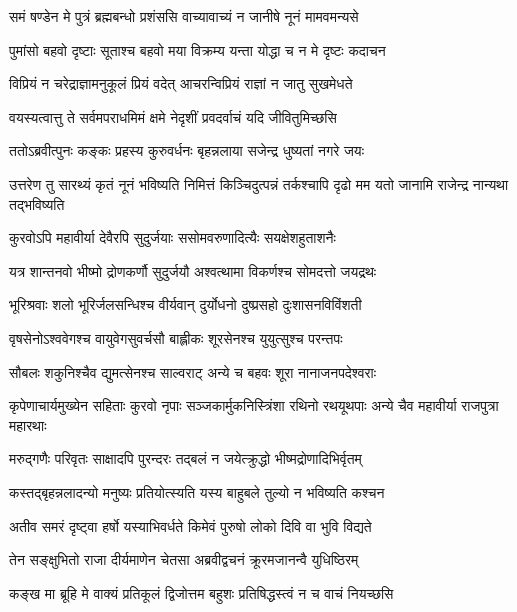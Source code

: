 


\twolineshloka
{समं षण्डेन मे पुत्रं ब्रह्मबन्धो प्रशंससि}
{वाच्यावाच्यं न जानीषे नूनं मामवमन्यसे}


\twolineshloka
{पुमांसो बहवो दृष्टाः सूताश्च बहवो मया}
{विक्रम्य यन्ता योद्धा च न मे दृष्टः कदाचन}


\twolineshloka
{विप्रियं न चरेद्राज्ञामनुकूलं प्रियं वदेत्}
{आचरन्विप्रियं राज्ञां न जातु सुखमेधते}


\twolineshloka
{वयस्यत्वात्तु ते सर्वमपराधमिमं क्षमे}
{नेदृशीं प्रवदर्वाचं यदि जीवितुमिच्छसि}



\twolineshloka
{ततोऽब्रवीत्पुनः कङ्कः प्रहस्य कुरुवर्धनः}
{बृहन्नलाया सजेन्द्र धुष्यतां नगरे जयः}


\threelineshloka
{उत्तरेण तु सारथ्यं कृतं नूनं भविष्यति}
{निमित्तं किञ्चिदुत्पन्नं तर्कश्चापि दृढो मम}
{यतो जानामि राजेन्द्र नान्यथा तद्भविष्यति}


\twolineshloka
{कुरवोऽपि महावीर्या देवैरपि सुदुर्जयाः}
{ससोमवरुणादित्यैः सयक्षेशहुताशनैः}


\twolineshloka
{यत्र शान्तनवो भीष्मो द्रोणकर्णौ सुदुर्जयौ}
{अश्वत्थामा विकर्णश्च सोमदत्तो जयद्रथः}


\twolineshloka
{भूरिश्रवाः शलो भूरिर्जलसन्धिश्च वीर्यवान्}
{दुर्योधनो दुष्प्रसहो दुःशासनविविंशती}


\twolineshloka
{वृषसेनोऽश्ववेगश्च वायुवेगसुवर्चसौ}
{बाह्लीकः शूरसेनश्च युयुत्सुश्च परन्तपः}


\twolineshloka
{सौबलः शकुनिश्चैव द्युमत्सेनश्च साल्वराट्}
{अन्ये च बहवः शूरा नानाजनपदेश्वराः}


\threelineshloka
{कृपेणाचार्यमुख्येन सहिताः कुरवो नृपाः}
{सञ्जकार्मुकनिस्त्रिंशा रथिनो रथयूथपाः}
{अन्ये चैव महावीर्या राजपुत्रा महारथाः}


\twolineshloka
{मरुद्गणैः परिवृतः साक्षादपि पुरन्दरः}
{तद्बलं न जयेत्क्रुद्धो भीष्मद्रोणादिभिर्वृतम्}


\twolineshloka
{कस्तद्बृहन्नलादन्यो मनुष्यः प्रतियोत्स्यति}
{यस्य बाहुबले तुल्यो न भविष्यति कश्चन}


\twolineshloka
{अतीव समरं दृष्ट्वा हर्षो यस्याभिवर्धते}
{किमेवं पुरुषो लोको दिवि वा भुवि विद्यते}



\twolineshloka
{तेन सङ्क्षुभितो राजा दीर्यमाणेन चेतसा}
{अब्रवीद्वचनं क्रूरमजानन्वै युधिष्ठिरम्}


\twolineshloka
{कङ्ख मा ब्रूहि मे वाक्यं प्रतिकूलं द्विजोत्तम}
{बहुशः प्रतिषिद्धस्त्वं न च वाचं नियच्छसि}


